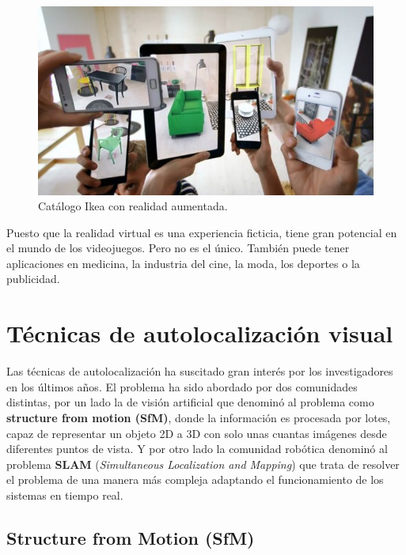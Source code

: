 \begin{figure}[th]
\centering
\includegraphics[scale=0.7]{Figures/ikea.jpg}
\decoRule
\caption[Ikea con realidad aumentada]{Catálogo Ikea con realidad aumentada.}
\label{fig:Ikea}
\end{figure}

Puesto que la realidad virtual es una experiencia ficticia, tiene gran potencial en el mundo de los videojuegos. Pero no es el único. También puede tener aplicaciones en medicina, la industria del cine, la moda, los deportes o la publicidad.

\section{Técnicas de autolocalización visual}

Las técnicas de autolocalización ha suscitado gran interés por los investigadores en los últimos años. El problema ha sido abordado por dos comunidades distintas, por un lado la de visión artificial que denominó al problema como \textbf{structure from motion (SfM)}, donde la información es procesada por lotes, capaz de representar un objeto 2D a 3D con solo unas cuantas imágenes desde diferentes puntos de vista. Y por otro lado la comunidad robótica denominó al problema \textbf{SLAM} (\textit{Simultaneous Localization and Mapping}) que trata de resolver el problema de una manera más compleja adaptando el funcionamiento de los sistemas en tiempo real.

\subsection{Structure from Motion (SfM)}

